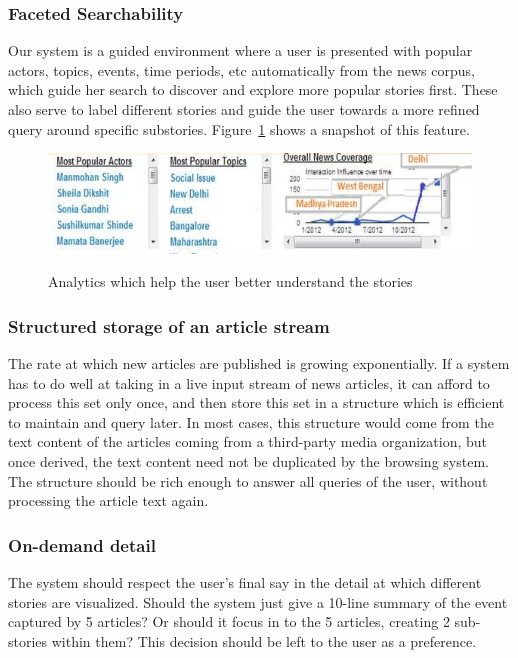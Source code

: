 \subsubsection{Faceted Searchability}
Our system is a guided environment where a user is presented with popular actors, topics, events, time periods, etc automatically from the 
news corpus, which guide her search to discover and explore more popular stories first. These also serve to label different stories and guide the
user towards a more refined query around specific substories. Figure~\ref{fig:faceted-search} shows a snapshot of this feature.
\begin{figure}[ht]
\begin{center}
\caption{Analytics which help the user better understand the stories}
\includegraphics[scale=0.34]{figures/faceted.png}
\label{fig:faceted-search}
\end{center}
\end{figure}

\subsubsection{Structured storage of an article stream}
The rate at which new articles are published is growing exponentially. If a system
has to do well at taking in a live input stream of news articles, it can afford to process this set only once, and then store this set in a structure
which is efficient to maintain and query later. In most cases, this structure would come from the text content of the articles coming from a third-party media organization, 
but once derived, the text content need not be duplicated by the browsing system. The structure should be rich enough to answer all queries of the user, without
processing the article text again.
\subsubsection{On-demand detail}
The system should respect the user's final say in the detail at which different stories are visualized. Should the system
just give a 10-line summary of the event captured by 5 articles? Or should it focus in to the 5 articles, creating 2 sub-stories within them? This decision
should be left to the user as a preference.
